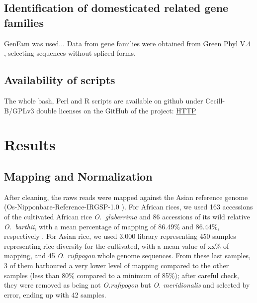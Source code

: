 \documentclass[10pt,letterpaper]{article}
\begin{document}
  \subsection*{Identification of domesticated related gene families}
  GenFam was used...
  Data from gene families were obtained from Green Phyl V.4  \cite{Conte2008b, Conte2008a, Rouard2011}, selecting sequences without spliced forms.
  
  \subsection*{Availability of scripts}
  The whole bash, Perl and R scripts are available on github under Cecill-B/GPLv3 double licenses on the GitHub of the project: \url{HTTP}

\section*{Results}
\subsection*{Mapping and Normalization}
After cleaning, the raws reads were mapped against the Asian reference genome (Os-Nipponbare-Reference-IRGSP-1.0 \cite{Mcnally2009, Kawahara2013}). For African rices, we used 163 accessions of the cultivated African rice \textit{O.~glaberrima} and 86 accessions of its wild relative \textit{O.~barthii}, with a mean percentage of mapping of 86.49\% and 86.44\%, respectively \cite{Cubry2018}. For Asian rice, we used 3,000 library representing 450 samples representing rice diversity for the cultivated, with a mean value of xx\% of mapping, and 45 \textit{O. rufipogon} whole genome sequences. From these last samples, 3 of them harboured a very lower level of mapping compared to the other samples (less than 80\% compared to a minimum of 85\%); after careful check, they were removed as being not \textit{O.rufipogon} but \textit{O. meridionalis} and selected by error, ending up with 42 samples. 
\end{document}
